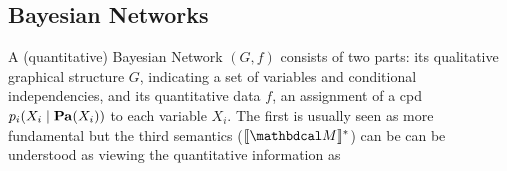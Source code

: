 \documentclass{article}
\begin{document}
	\subsection{Bayesian Networks} 
	\label{sec:bn-convert}
		A (quantitative) Bayesian Network $(G, f)$ consists of two parts: its qualitative graphical structure $G$, indicating a set of
		variables and
		conditional independencies, and its quantitative data $f$, an assignment of 
		a cpd $p_i(X_i \mid \mathbf{Pa}(X_i))$ to each variable $X_i$.
	    	The first is usually seen as more fundamental
	            but the third semantics ($\bbr{\dg M}^*$) can be
	            can be understood as viewing the quantitative information as
\end{document}
